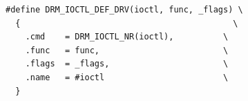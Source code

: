 \begin{lstlisting}[label={lst:drm-ioctl-drv}, escapechar=@]
#define DRM_IOCTL_DEF_DRV(ioctl, func, _flags) \
  {                                           \
    .cmd    = DRM_IOCTL_NR(ioctl),          \
    .func   = func,                         \
    .flags  = _flags,                       \
    .name   = #ioctl                        \
  }
\end{lstlisting}
  





